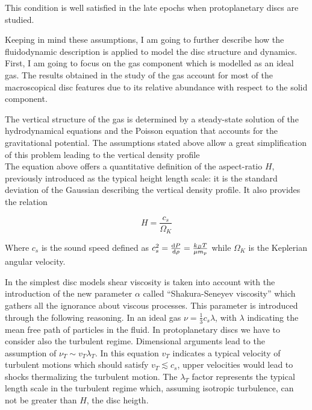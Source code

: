 \documentclass[a4paper,10pt]{report}
\begin{document}
This condition is well satisfied in the late epochs when protoplanetary discs are studied.

Keeping in mind these assumptions, I am going to further describe how the fluidodynamic description is applied to model the disc structure and  
dynamics. First, I am going to focus on the gas component which is modelled as an ideal gas.
The results obtained in the study of the gas account for most of the macroscopical disc features due to its
relative abundance with respect to the solid component.

The vertical structure of the gas is determined by a steady-state solution of the hydrodynamical equations and the Poisson equation that
accounts for the gravitational potential. The assumptions stated above allow a great simplification of this problem leading to the vertical density profile
\begin{equation}
\end{equation}
The equation above offers a quantitative definition of the aspect-ratio $H$, previously introduced as the typical height length scale: it is the 
standard deviation of the Gaussian describing the vertical density profile. It also provides the relation

\begin{equation}
    H = \frac{c_s}{\Omega_K}
\end{equation}

Where $c_s$ is the sound speed defined as $c_s^2 = \dv{P}{\rho} = \frac{k_BT}{\mu m_p}$ while $\Omega_K$ is the Keplerian 
angular velocity.

In the simplest disc models shear viscosity is taken into account with the introduction of the new parameter $\alpha$
called ``Shakura-Seneyev viscosity'' which gathers all the ignorance about viscous processes.
This parameter is introduced through the following reasoning.
In an ideal gas $\nu = \frac{1}{3}c_s\lambda$, with $\lambda$ indicating the mean free path of particles in the fluid.
In protoplanetary discs we have to consider also the turbulent regime. Dimensional arguments lead to the
assumption of $\nu_T \sim v_T \lambda_T$. In this equation $v_T$ indicates a typical velocity of turbulent motions which should 
satisfy $v_T \lesssim c_s$, upper velocities would lead to shocks thermalizing the turbulent motion. The $\lambda_T$ factor 
represents the typical length scale in the turbulent regime which, assuming isotropic turbulence, can not be greater than $H$, the disc heigth.
\end{document}
